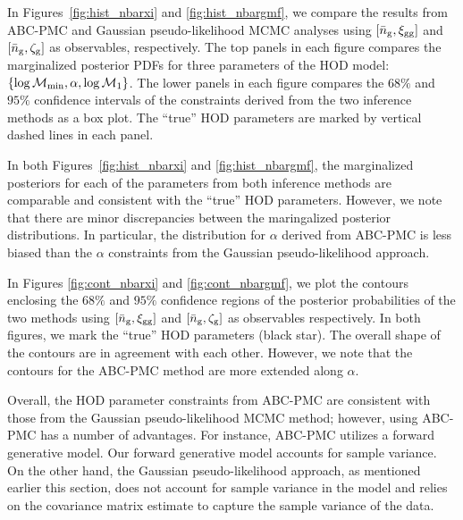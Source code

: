 In Figures~\ref{fig:hist_nbarxi} and \ref{fig:hist_nbargmf}, we compare the results from
ABC-PMC and Gaussian pseudo-likelihood MCMC analyses using $[\bar{n}_{\mathrm{g}}, \xi_{\mathrm{gg}}]$ and 
$[\bar{n}_{\mathrm{g}}, \mathcal{\zeta}_{\rm g}]$ as observables, respectively. The top panels in each figure 
compares the marginalized posterior PDFs for three parameters of the HOD model: 
$\{\log \mathcal{M}_{\rm min}, \alpha, \log\mathcal{M}_1\}$. The lower panels in each 
figure compares the $68\%$ and $95\%$ confidence intervals of the constraints 
derived from the two inference methods as a box plot. The ``true'' HOD parameters
are marked by vertical dashed lines in each panel. 

In both Figures~\ref{fig:hist_nbarxi} and \ref{fig:hist_nbargmf}, the marginalized 
posteriors for each of the parameters from both inference methods are comparable 
and consistent with the ``true'' HOD parameters. However, we note that there are 
minor discrepancies between the maringalized posterior distributions. In particular, 
the distribution for $\alpha$ derived from ABC-PMC is less biased than the $\alpha$ 
constraints from the Gaussian pseudo-likelihood approach. 

In Figures \ref{fig:cont_nbarxi} and \ref{fig:cont_nbargmf}, we plot the contours 
enclosing the $68\%$ and $95\%$ confidence regions of the posterior probabilities of 
the two methods using $[\bar{n}_{\mathrm{g}}, \xi_{\mathrm{gg}}]$ and $[\bar{n}_{\mathrm{g}}, \mathcal{\zeta}_{\rm g}]$ as observables 
respectively. In both figures, we mark the ``true'' HOD parameters (black star). The 
overall shape of the contours are in agreement with each other. However, we note
that the contours for the ABC-PMC method are more extended along $\alpha$. 

Overall, the HOD parameter constraints from ABC-PMC are consistent with those from 
the Gaussian pseudo-likelihood MCMC method; however, using ABC-PMC has a number of 
advantages. For instance, ABC-PMC utilizes a forward generative model. Our forward 
generative model accounts for sample variance. On the other hand, the Gaussian 
pseudo-likelihood approach, as mentioned earlier this section, does not account 
for sample variance in the model and relies on the covariance matrix estimate to 
capture the sample variance of the data. 

